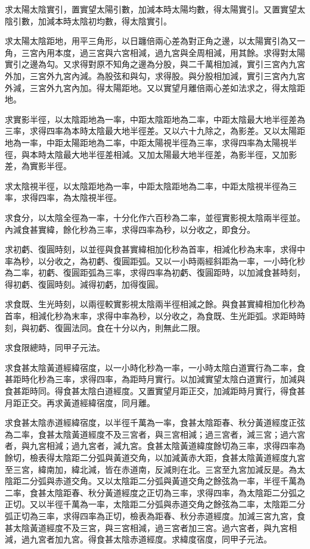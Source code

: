 \begin{pinyinscope}
求太陽太陰實引，置實望太陽引數，加減本時太陽均數，得太陽實引。又置實望太陰引數，加減本時太陰初均數，得太陰實引。

求太陽太陰距地，用平三角形，以日躔倍兩心差為對正角之邊，以太陽實引為又一角，三宮內用本度，過三宮與六宮相減，過九宮與全周相減，用其餘。求得對太陽實引之邊為勾。又求得對原不知角之邊為分股，與二千萬相加減，實引三宮內九宮外加，三宮外九宮內減。為股弦和與勾，求得股。與分股相加減，實引三宮內九宮外減，三宮外九宮內加。得太陽距地。又以實望月離倍兩心差如法求之，得太陰距地。

求實影半徑，以太陰距地為一率，中距太陰距地為二率，中距太陰最大地半徑差為三率，求得四率為本時太陰最大地半徑差。又以六十九除之，為影差。又以太陽距地為一率，中距太陽距地為二率，中距太陽視半徑為三率，求得四率為太陽視半徑，與本時太陰最大地半徑差相減。又加太陽最大地半徑差，為影半徑，又加影差，為實影半徑。

求太陰視半徑，以太陰距地為一率，中距太陰距地為二率，中距太陰視半徑為三率，求得四率，為太陰視半徑。

求食分，以太陰全徑為一率，十分化作六百秒為二率，並徑實影視太陰兩半徑並。內減食甚實緯，餘化秒為三率，求得四率為秒，以分收之，即食分。

求初虧、復圓時刻，以並徑與食甚實緯相加化秒為首率，相減化秒為末率，求得中率為秒，以分收之，為初虧、復圓距弧。又以一小時兩經斜距為一率，一小時化秒為二率，初虧、復圓距弧為三率，求得四率為初虧、復圓距時，以加減食甚時刻，得初虧、復圓時刻。減得初虧，加得復圓。

求食既、生光時刻，以兩徑較實影視太陰兩半徑相減之餘。與食甚實緯相加化秒為首率，相減化秒為末率，求得中率為秒，以分收之，為食既、生光距弧。求距時時刻，與初虧、復圓法同。食在十分以內，則無此二限。

求食限總時，同甲子元法。

求食甚太陰黃道經緯宿度，以一小時化秒為一率，一小時太陰白道實行為二率，食甚距時化秒為三率，求得四率，為距時月實行。以加減實望太陰白道實行，加減與食甚距時同。得食甚太陰白道經度。又置實望月距正交，加減距時月實行，得食甚月距正交。再求黃道經緯宿度，同月離。

求食甚太陰赤道經緯宿度，以半徑千萬為一率，食甚太陰距春、秋分黃道經度正弦為二率，食甚太陰黃道經度不及三宮者，與三宮相減；過三宮者，減三宮；過六宮者，與九宮相減；過九宮者，減九宮。食甚太陰黃道緯度餘切為三率，求得四率為餘切，檢表得太陰距二分弧與黃道交角，以加減黃赤大距，食甚太陰黃道經度九宮至三宮，緯南加，緯北減，皆在赤道南，反減則在北。三宮至九宮加減反是。為太陰距二分弧與赤道交角。又以太陰距二分弧與黃道交角之餘弦為一率，半徑千萬為二率，食甚太陰距春、秋分黃道經度之正切為三率，求得四率，為太陰距二分弧之正切。又以半徑千萬為一率，太陰距二分弧與赤道交角之餘弦為二率，太陰距二分弧正切為三率，求得四率為正切，檢表為距春、秋分赤道經度。加減三宮九宮，食甚太陰黃道經度不及三宮，與三宮相減，過三宮者加三宮。過六宮者，與九宮相減，過九宮者加九宮。得食甚太陰赤道經度。求緯度宿度，同甲子元法。


\end{pinyinscope}
